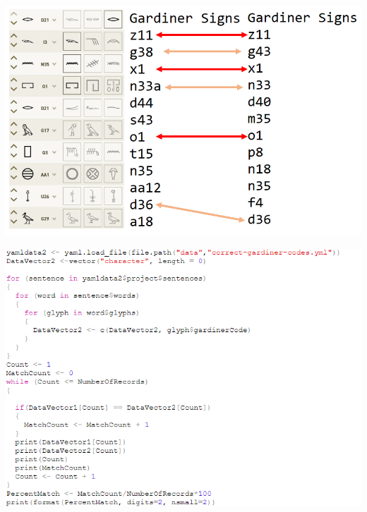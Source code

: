 \documentclass[unknownkeysallowed,usepdftitle=false, parskip=full]{beamer}
\newcommand{\secvariable}{nothing}
\begin{document}


\begin{frame}\label{\secvariable}

\begin{center}
\includegraphics[width=1.0\textwidth,keepaspectratio]{figure/almost.PNG}
\end{center}

\end{frame}



\begin{frame}\label{\secvariable}

\begin{center}
\includegraphics[width=1.0\textwidth,keepaspectratio]{figure/matches2.PNG}
\end{center}
\vfill

\end{frame}
\end{document}
